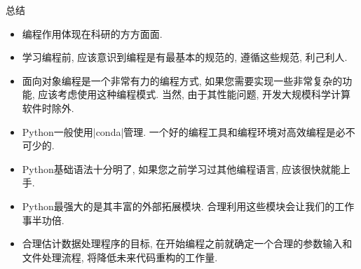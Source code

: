 \documentclass{beamer}
\begin{document}
    \begin{frame}[fragile]{总结}
    \begin{block}{}
      \begin{itemize}
        \item 编程作用体现在科研的方方面面.
        \item 学习编程前, 应该意识到编程是有最基本的规范的, 遵循这些规范, 利己利人.
        \item 面向对象编程是一个非常有力的编程方式, 如果您需要实现一些非常复杂的功能, 应该考虑使用这种编程模式. 当然, 由于其性能问题, 开发大规模科学计算软件时除外.
        \item Python一般使用\cverb|conda|管理. 一个好的编程工具和编程环境对高效编程是必不可少的.
        \item Python基础语法十分明了, 如果您之前学习过其他编程语言, 应该很快就能上手.
        \item Python最强大的是其丰富的外部拓展模块. 合理利用这些模块会让我们的工作事半功倍.
        \item 合理估计数据处理程序的目标, 在开始编程之前就确定一个合理的参数输入和文件处理流程, 将降低未来代码重构的工作量.
      \end{itemize}
    \end{block}
  \end{frame}
\end{document}
